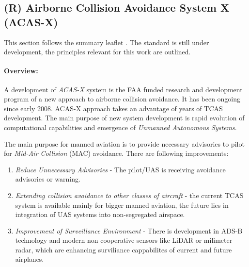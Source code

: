 \subsection{(R) Airborne Collision Avoidance System X  (ACAS-X)}\label{sec:ACASX}
\noindent This section follows the summary leaflet \cite{netalert2013n17}. The standard is still under development, the principles relevant for this work are outlined. 

\paragraph{Overview:} A development of \emph{ACAS-X} system is the FAA funded research and development program of a new approach to airborne collision avoidance. It has been ongoing since early 2008. ACAS-X approach takes an advantage of years of TCAS development. The main purpose of new system development is rapid evolution of computational capabilities and emergence of \emph{Unmanned Autonomous  Systems}.

The main purpose for manned aviation is to provide necessary advisories to pilot for \emph{Mid-Air Collision} (MAC) avoidance. There are following improvements:

\begin{enumerate}
    \item \emph{Reduce Unnecessary Advisories} - The pilot/UAS is receiving avoidance advisories or warning. 
    
    \item \emph{Extending collision avoidance to other classes of aircraft} - the current TCAS system is available mainly for bigger manned aviation, the future lies in integration of UAS systems into non-segregated airspace.
    
    \item \emph{Improvement of Surveillance Environment} - There is development in ADS-B technology and modern non cooperative sensors like LiDAR or milimeter radar, which are enhancing surviliance cappabilites of current and future airplanes.
\end{enumerate}

